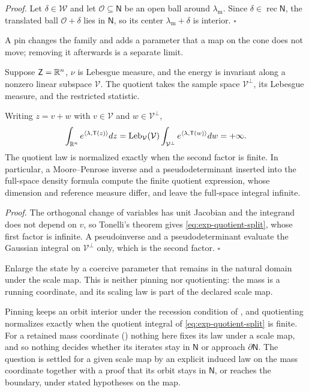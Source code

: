 \noindent\emph{Proof.}
Let \(\delta\in\mathcal W\) and let \(\mathcal O\subseteq\mathsf N\) be an open ball
around \(\lambda_{\mathrm m}\). Since \(\delta\in\operatorname{rec}\mathsf N\),
the translated ball \(\mathcal O+\delta\) lies in \(\mathsf N\), so its center
\(\lambda_{\mathrm m}+\delta\) is interior. \(\square\)

A pin changes the family and adds a parameter that a map on the cone does not
move; removing it afterwards is a separate limit.

Suppose \(\mathsf Z=\mathbb R^n\), \(\nu\) is Lebesgue measure, and the energy is
invariant along a nonzero linear subspace \(\mathcal V\). The quotient takes
the sample space \(\mathcal V^\perp\), its Lebesgue measure, and the restricted
statistic.

Writing \(z=v+w\) with \(v\in\mathcal V\) and \(w\in\mathcal V^\perp\),
\begin{equation}
\int_{\mathbb R^n}e^{\langle\lambda,\mathsf T(z)\rangle}dz
=\operatorname{Leb}_{\mathcal V}(\mathcal V)
\int_{\mathcal V^\perp}e^{\langle\lambda,\mathsf T(w)\rangle}dw
=+\infty.
\label{eq:exp-quotient-split}
\end{equation}
The quotient law is normalized exactly when the second factor is finite. In
particular, a Moore--Penrose inverse and a pseudodeterminant inserted into the
full-space density formula compute the finite quotient expression, whose
dimension and reference measure differ, and leave the full-space integral
infinite. 

\noindent\emph{Proof.}
The orthogonal change of variables has unit Jacobian and the integrand does
not depend on \(v\), so Tonelli's theorem gives
\eqref{eq:exp-quotient-split}, whose first factor is infinite. A
pseudoinverse and a pseudodeterminant evaluate the Gaussian integral on
\(\mathcal V^\perp\) only, which is the second factor. \(\square\)

Enlarge the state by a coercive parameter that remains in the natural domain
under the scale map. This is neither pinning nor quotienting: the mass is a
running coordinate, and its scaling law is part of the declared scale map.

Pinning keeps an orbit interior under the recession condition of
, and quotienting normalizes exactly when
the quotient integral of \eqref{eq:exp-quotient-split} is finite. For a
retained mass coordinate () nothing here fixes its
law under a scale map, and so nothing decides whether its iterates stay in
\(\mathsf N\) or approach \(\partial\mathsf N\). The question is settled for a
given scale map by an explicit induced law on the mass coordinate together
with a proof that its orbit stays in \(\mathsf N\), or reaches the boundary,
under stated hypotheses on the map.

